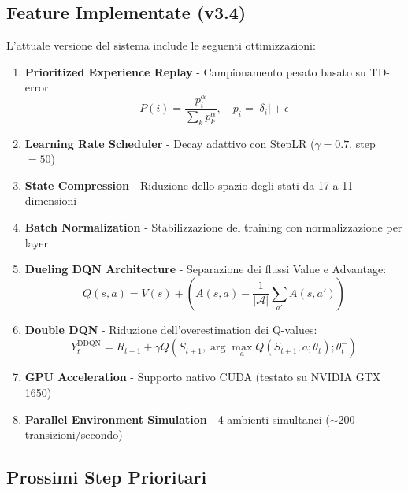 \documentclass[a4paper,11pt]{article}
\begin{document}
\subsection{Feature Implementate (v3.4)}

L'attuale versione del sistema include le seguenti ottimizzazioni:

\begin{enumerate}[label=\arabic*.]
    \item \textbf{Prioritized Experience Replay} - Campionamento pesato basato su TD-error:
    \begin{equation}
        P(i) = \frac{p_i^\alpha}{\sum_k p_k^\alpha}, \quad p_i = |\delta_i| + \epsilon
    \end{equation}
    
    \item \textbf{Learning Rate Scheduler} - Decay adattivo con StepLR ($\gamma = 0.7$, step $= 50$)
    
    \item \textbf{State Compression} - Riduzione dello spazio degli stati da 17 a 11 dimensioni
    
    \item \textbf{Batch Normalization} - Stabilizzazione del training con normalizzazione per layer
    
    \item \textbf{Dueling DQN Architecture} - Separazione dei flussi Value e Advantage:
    \begin{equation}
        Q(s, a) = V(s) + \left( A(s, a) - \frac{1}{|\mathcal{A}|} \sum_{a'} A(s, a') \right)
    \end{equation}
    
    \item \textbf{Double DQN} - Riduzione dell'overestimation dei Q-values:
    \begin{equation}
        Y_t^{\text{DDQN}} = R_{t+1} + \gamma Q\left(S_{t+1}, \arg\max_a Q(S_{t+1}, a; \theta_t); \theta_t^-\right)
    \end{equation}
    
    \item \textbf{GPU Acceleration} - Supporto nativo CUDA (testato su NVIDIA GTX 1650)
    
    \item \textbf{Parallel Environment Simulation} - 4 ambienti simultanei ($\sim$200 transizioni/secondo)
\end{enumerate}

\subsection{Prossimi Step Prioritari}
\end{document}
